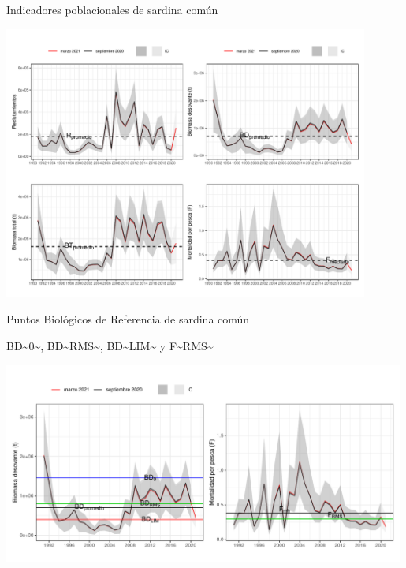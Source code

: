\documentclass[
  ignorenonframetext,
]{beamer}
\begin{document}
\begin{frame}{Indicadores poblacionales de sardina común}
\protect\hypertarget{indicadores-poblacionales-de-sardina-comuxfan}{}
\begin{center}
\includegraphics[width=0.9\textwidth]{FigurasInforme_Marzo/F35_Varpobl-1.pdf}
\end{center}
\end{frame}

\begin{frame}{Puntos Biológicos de Referencia de sardina común}
\protect\hypertarget{puntos-bioluxf3gicos-de-referencia-de-sardina-comuxfan}{}
\begin{block}{BD\textasciitilde0\textasciitilde,
BD\textasciitilde RMS\textasciitilde,
BD\textasciitilde LIM\textasciitilde{} y
F\textasciitilde RMS\textasciitilde{}}
\protect\hypertarget{bd0-bdrms-bdlim-y-frms}{}
\begin{center}
\includegraphics[width=0.99\textwidth]{FigurasInforme_Marzo/F37_PBRs_Bmed_Fmed-1.pdf}
\end{center}
\end{block}
\end{frame}
\end{document}
